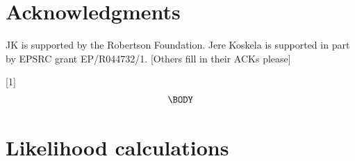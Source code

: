 \documentclass{article}
\begin{document}
\section*{Acknowledgments}
JK is supported by the Robertson Foundation.
Jere Koskela is supported in part by EPSRC grant EP/R044732/1.
[Others fill in their ACKs please]





 \newcommand{\be}{\begin{equation}}
 \newcommand{\ee}{\end{equation}}
 \newcommand{\bd}{\begin{displaymath}}
 \newcommand{\ed}{\end{displaymath}}
\newcommand{\IN}{\ensuremath{\mathds{N}}}%
\newcommand{\EE}[1]{\ensuremath{\mathds{E}\left[ #1 \right]}}%
\newcommand{\one}[1]{\ensuremath{\mathds{1}_{\left\{ #1 \right\}}}}%
\newcommand{\prb}[1]{\ensuremath{\mathds{P}\left( #1 \right) } }%

[1]{%
\begin{equation}
\label{#1}
\begin{split}
  \BODY
\end{split}\end{equation}
}

\setcounter{secnumdepth}{2} %

\appendix

\label{app-likelihoods}
\section*{Likelihood calculations}
\end{document}

